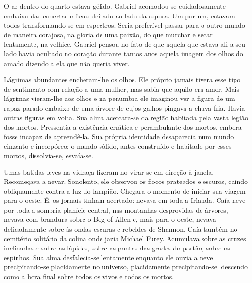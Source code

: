 O ar dentro do quarto estava gélido. Gabriel acomodou-se cuidadosamente
embaixo das cobertas e ficou deitado ao lado da esposa. Um por um,
estavam todos transformando-se em espectros. Seria preferível passar
para o outro mundo de maneira corajosa, na glória de uma paixão, do
que murchar e secar lentamente, na velhice. Gabriel pensou no fato
de que aquela que estava ali a seu lado havia ocultado no coração
durante tantos anos aquela imagem dos olhos do amado dizendo a ela que
não queria viver.

Lágrimas abundantes encheram-lhe os olhos. Ele próprio jamais tivera
esse tipo de sentimento com relação a uma mulher, mas sabia que aquilo
era amor. Mais lágrimas vieram-lhe aos olhos e na penumbra ele
imaginou ver a figura de um rapaz parado embaixo de uma árvore de
cujos galhos pingava a chuva fria. Havia outras figuras em volta. Sua
alma acercara-se da região habitada pela vasta legião dos mortos.
Pressentia a existência errática e perambulante dos mortos, embora
fosse incapaz de apreendê-la. Sua própria identidade desaparecia num
mundo cinzento e incorpóreo; o mundo sólido, antes construído e
habitado por esses mortos, dissolvia-se, esvaía-se.

Umas batidas leves na vidraça fizeram-no virar-se em direção à janela.
Recomeçava a nevar. Sonolento, ele observou os flocos prateados e
escuros, caindo obliquamente contra a luz do lampião. Chegara o
momento de iniciar sua viagem para o oeste. É, os jornais tinham
acertado: nevava em toda a Irlanda. Caía neve por toda a sombria
planície central, nas montanhas desprovidas de árvores, nevava com
brandura sobre o Bog of Allen e, mais para o oeste, nevava
delicadamente sobre às ondas escuras e rebeldes de Shannon. Caía
também no cemitério solitário da colina onde jazia Michael Furey.
Acumulava sobre as cruzes inclinadas e sobre
as lápides, sobre as pontas das grades do portão, sobre os espinhos.
Sua alma desfalecia-se lentamente enquanto ele ouvia a neve
precipitando-se placidamente no universo, placidamente
precipitando-se, descendo como a hora final sobre todos os vivos e
todos os mortos.

